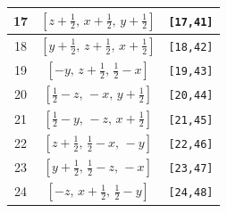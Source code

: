 \documentclass[fleqn,8pt]{jsarticle}
\begin{document}
\begin{longtable}{ccc}
17 & $\left[ z + \frac{1}{2},\, x + \frac{1}{2},\, y + \frac{1}{2} \right]$ & {\tt [17,41]} \\ \hline
18 & $\left[ y + \frac{1}{2},\, z + \frac{1}{2},\, x + \frac{1}{2} \right]$ & {\tt [18,42]} \\ \hline
19 & $\left[ - y,\, z + \frac{1}{2},\, \frac{1}{2} - x \right]$ & {\tt [19,43]} \\ \hline
20 & $\left[ \frac{1}{2} - z,\, - x,\, y + \frac{1}{2} \right]$ & {\tt [20,44]} \\ \hline
21 & $\left[ \frac{1}{2} - y,\, - z,\, x + \frac{1}{2} \right]$ & {\tt [21,45]} \\ \hline
22 & $\left[ z + \frac{1}{2},\, \frac{1}{2} - x,\, - y \right]$ & {\tt [22,46]} \\ \hline
23 & $\left[ y + \frac{1}{2},\, \frac{1}{2} - z,\, - x \right]$ & {\tt [23,47]} \\ \hline
24 & $\left[ - z,\, x + \frac{1}{2},\, \frac{1}{2} - y \right]$ & {\tt [24,48]} \\
\end{longtable}
\end{document}
